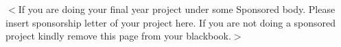 \newpage
\thispagestyle{empty}
$<$If you are doing your final year project under some Sponsored body. Please insert sponsorship letter of your project here. If you are not doing a sponsored project kindly remove this page from your blackbook.$>$\newline